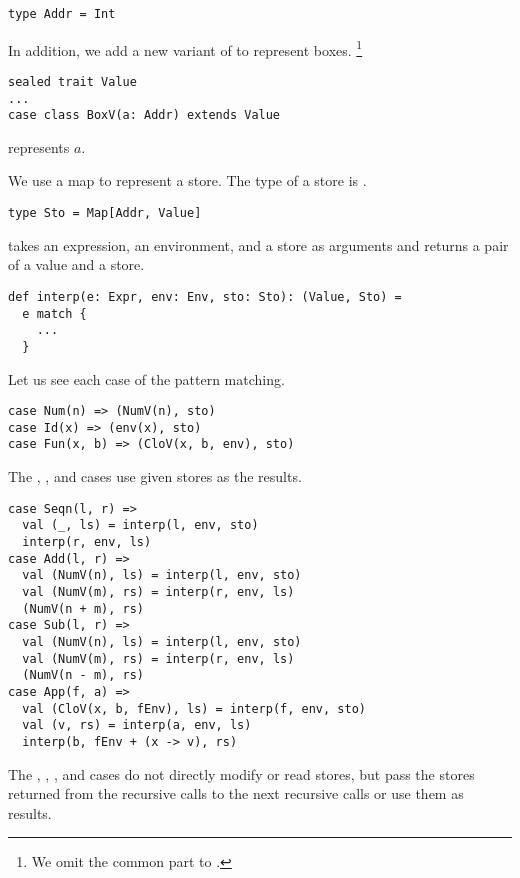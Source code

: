 \begin{verbatim}
type Addr = Int
\end{verbatim}

In addition, we add a new variant of  to represent boxes.
\footnote{We omit the common part to \plang.}

\begin{verbatim}
sealed trait Value
...
case class BoxV(a: Addr) extends Value
\end{verbatim}

 represents $a$.

We use a map to represent a store. The type of a store is .

\begin{verbatim}
type Sto = Map[Addr, Value]
\end{verbatim}

 takes an expression, an environment, and a store as arguments and
returns a pair of a value and a store.

\begin{verbatim}
def interp(e: Expr, env: Env, sto: Sto): (Value, Sto) =
  e match {
    ...
  }
\end{verbatim}

Let us see each case of the pattern matching.

\begin{verbatim}
case Num(n) => (NumV(n), sto)
case Id(x) => (env(x), sto)
case Fun(x, b) => (CloV(x, b, env), sto)
\end{verbatim}

The , , and  cases use given stores as the results.

\begin{verbatim}
case Seqn(l, r) =>
  val (_, ls) = interp(l, env, sto)
  interp(r, env, ls)
case Add(l, r) =>
  val (NumV(n), ls) = interp(l, env, sto)
  val (NumV(m), rs) = interp(r, env, ls)
  (NumV(n + m), rs)
case Sub(l, r) =>
  val (NumV(n), ls) = interp(l, env, sto)
  val (NumV(m), rs) = interp(r, env, ls)
  (NumV(n - m), rs)
case App(f, a) =>
  val (CloV(x, b, fEnv), ls) = interp(f, env, sto)
  val (v, rs) = interp(a, env, ls)
  interp(b, fEnv + (x -> v), rs)
\end{verbatim}

The , , , and  cases do not directly
modify or read stores, but pass the stores returned from the recursive calls to the
next recursive calls or use them as results.


